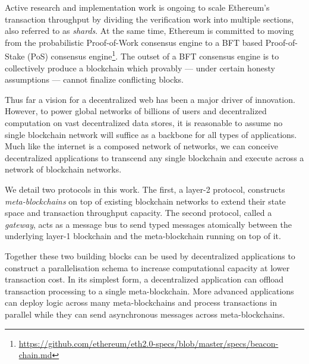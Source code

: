 \documentclass[12pt,a4paper]{article}
\begin{document}
Active research and implementation work is ongoing to scale Ethereum's transaction throughput by dividing the verification work into multiple sections, also referred to as \emph{shards}.
At the same time, Ethereum is committed to moving from the probabilistic Proof-of-Work consensus engine to a BFT based Proof-of-Stake (PoS) consensus engine\footnote{
	\url{https://github.com/ethereum/eth2.0-specs/blob/master/specs/beacon-chain.md}
}.
The outset of a BFT consensus engine is to collectively produce a blockchain which provably --- under certain honesty assumptions --- cannot finalize conflicting blocks.



Thus far a vision for a decentralized web has been a major driver of innovation.
However, to power global networks of billions of users and decentralized computation on vast decentralized data stores, it is reasonable to assume no single blockchain network will suffice as a backbone for all types of applications.
Much like the internet is a composed network of networks, we can conceive decentralized applications to transcend any single blockchain and execute across a network of blockchain networks.

We detail two protocols in this work.
The first, a layer-2 protocol, constructs \emph{meta-blockchains} on top of existing blockchain networks to extend their state space and transaction throughput capacity.
The second protocol, called a \emph{gateway}, acts as a message bus to send typed messages atomically between the underlying layer-1 blockchain and the meta-blockchain running on top of it.

Together these two building blocks can be used by decentralized applications to construct a parallelisation schema to increase %
computational capacity at lower transaction cost.
In its simplest form, a decentralized application can offload transaction processing to a single meta-blockchain.
More advanced applications can deploy logic across many meta-blockchains and process transactions in parallel while they can send asynchronous messages across meta-blockchains.
\end{document}
